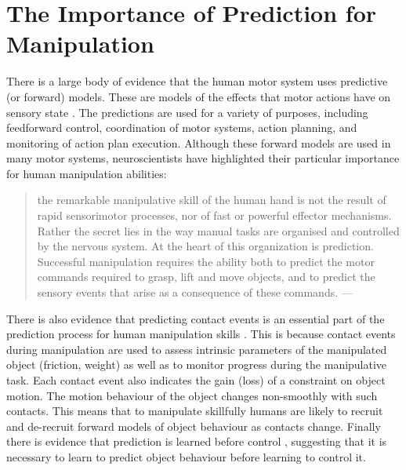 \section{The Importance of Prediction for Manipulation}
\label{sec:motivation}
There is a large body of evidence that the human motor system uses predictive (or forward) models. These are models of the effects that motor actions have on sensory state \citep{flanagan03,flanagan06,mehta02,witney00,johansson92}. The predictions are used for a variety of purposes, including feedforward control, coordination of motor systems, action planning, and monitoring of action plan execution. Although these forward models are used in many motor systems, neuroscientists have highlighted their particular importance for human manipulation abilities:

\begin{quotation} the remarkable manipulative skill of the human hand is not the result of rapid sensorimotor processes, nor of fast or powerful effector mechanisms. Rather the secret lies in the way manual tasks are  organised and controlled by the nervous system. At the heart of this organization is prediction. Successful manipulation requires the ability both to predict the motor commands required to grasp, lift and move objects, and to predict the sensory events that arise as a consequence of these commands. --- \citep{flanagan06}
\end{quotation}

There is also evidence that predicting contact events is an essential part of the prediction process for human manipulation skills \citep{flanagan06}. This is because contact events during manipulation are used to assess intrinsic parameters of the manipulated object (friction, weight) as well as to monitor progress during the manipulative task. Each contact event also indicates the gain (loss) of a constraint on object motion. The motion behaviour of the object changes non-smoothly with such contacts. This means that to manipulate skillfully humans are likely to recruit and de-recruit  forward models of object behaviour as contacts change.  Finally there is evidence that prediction is learned before control \citep{flanagan03}, suggesting that it is necessary to learn to predict object behaviour before learning to control it.

